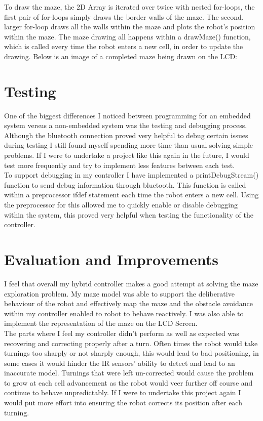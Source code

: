 \documentclass[a4paper]{article}
\begin{document}
	To draw the maze, the 2D Array is iterated over twice with nested for-loops, the first pair of for-loops simply draws the border walls of the maze. The second, larger for-loop draws all the walls within the maze and plots the robot's position within the maze. The maze drawing all happens within a drawMaze() function, which is called every time the robot enters a new cell, in order to update the drawing. Below is an image of a completed maze being drawn on the LCD: 
	
	\section{Testing}
	One of the biggest differences I noticed between programming for an embedded system versus a non-embedded system was the testing and debugging process. Although the bluetooth connection proved very helpful to debug certain issues during testing I still found myself spending more time than usual solving simple problems. If I were to undertake a project like this again in the future, I would test more frequently and try to implement less features between each test.\\
	
	To support debugging in my controller I have implemented a printDebugStream() function to send debug information through bluetooth. This function is called within a preprocessor ifdef statement each time the robot enters a new cell. Using the preprocessor for this allowed me to quickly enable or disable debugging within the system, this proved very helpful when testing the functionality of the controller.
	
	\section{Evaluation and Improvements}
	I feel that overall my hybrid controller makes a good attempt at solving the maze exploration problem. My maze model was able to support the deliberative behaviour of the robot and effectively map the maze and the obstacle avoidance within my controller enabled to robot to behave reactively. I was also able to implement the representation of the maze on the LCD Screen.\\
	
	The parts where I feel my controller didn't perform as well as expected was recovering and correcting properly after a turn. Often times the robot would take turnings too sharply or not sharply enough, this would lead to bad positioning, in some cases it would hinder the IR sensors' ability to detect and lead to an inaccurate model. Turnings that were left un-corrected would cause the problem to grow at each cell advancement as the robot would veer further off course and continue to behave unpredictably. If I were to undertake this project again I would put more effort into ensuring the robot corrects its position after each turning.\\
	
\end{document}
